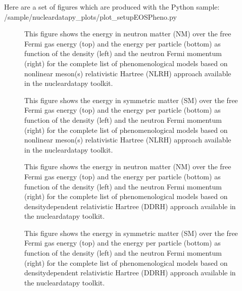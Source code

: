 \documentclass[letterpaper,10pt,english]{sphinxmanual}
\begin{document}
\sphinxAtStartPar
Here are a set of figures which are produced with the Python sample: /sample/nucleardatapy\_plots/plot\_setupEOSPheno.py

\begin{figure}[htbp]
\centering
\capstart

\noindent{}
\caption{This figure shows the energy in neutron matter (NM) over the free Fermi gas energy (top) and the energy per particle (bottom) as function of the density (left) and the neutron Fermi momentum (right) for the complete list of phenomenological models based on non\sphinxhyphen{}linear meson(s) relativistic Hartree (NLRH) approach available in the nucleardatapy toolkit.}\label{\detokenize{source/api/setup_eos_pheno:id1}}\end{figure}

\begin{figure}[htbp]
\centering
\capstart

\noindent{}
\caption{This figure shows the energy in symmetric matter (SM) over the free Fermi gas energy (top) and the energy per particle (bottom) as function of the density (left) and the neutron Fermi momentum (right) for the complete list of phenomenological models based on non\sphinxhyphen{}linear meson(s) relativistic Hartree (NLRH) approach available in the nucleardatapy toolkit.}\label{\detokenize{source/api/setup_eos_pheno:id2}}\end{figure}

\begin{figure}[htbp]
\centering
\capstart

\noindent{}
\caption{This figure shows the energy in neutron matter (NM) over the free Fermi gas energy (top) and the energy per particle (bottom) as function of the density (left) and the neutron Fermi momentum (right) for the complete list of phenomenological models based on density\sphinxhyphen{}dependent relativistic Hartree (DDRH) approach available in the nucleardatapy toolkit.}\label{\detokenize{source/api/setup_eos_pheno:id3}}\end{figure}

\begin{figure}[htbp]
\centering
\capstart

\noindent{}
\caption{This figure shows the energy in symmetric matter (SM) over the free Fermi gas energy (top) and the energy per particle (bottom) as function of the density (left) and the neutron Fermi momentum (right) for the complete list of phenomenological models based on density\sphinxhyphen{}dependent relativistic Hartree (DDRH) approach available in the nucleardatapy toolkit.}\label{\detokenize{source/api/setup_eos_pheno:id4}}\end{figure}
\end{document}
